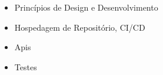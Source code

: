 \documentclass[10pt,a4paper,ragged2e,withhyper]{altacv}
\begin{document}
\begin{paracol}{2}
\begin{itemize}
\item{Princípios de Design e Desenvolvimento}
\end{itemize}

\divider\smallskip

\begin{itemize}
\item{Hospedagem de Repositório, CI/CD}
\end{itemize}

\divider\smallskip

\begin{itemize}
\item{Apis} 
\end{itemize}

\divider\smallskip

\begin{itemize}
\item{Testes}
\end{itemize}



\medskip




\end{paracol}
\end{document}
